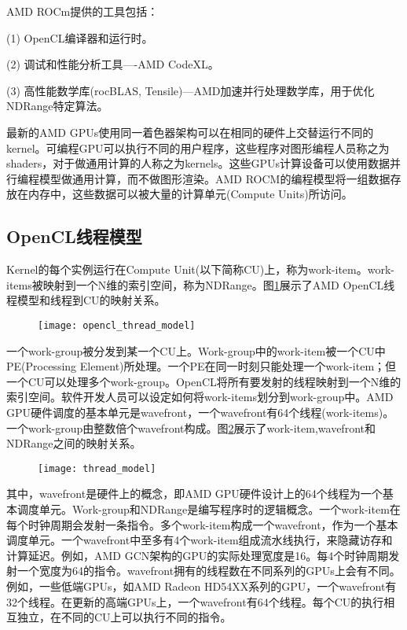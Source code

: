 AMD ROCm提供的工具包括：

(1) OpenCL编译器和运行时。

(2) 调试和性能分析工具----AMD CodeXL。

(3) 高性能数学库(rocBLAS, Tensile)---AMD加速并行处理数学库，用于优化NDRange特定算法。

最新的AMD GPUs使用同一着色器架构可以在相同的硬件上交替运行不同的kernel。可编程GPU可以执行不同的用户程序，这些程序对图形编程人员称之为shaders，对于做通用计算的人称之为kernels。这些GPUs计算设备可以使用数据并行编程模型做通用计算，而不做图形渲染。AMD ROCM的编程模型将一组数据存放在内存中，这些数据可以被大量的计算单元(Compute Units)所访问。

\subsection{OpenCL线程模型}
Kernel的每个实例运行在Compute Unit(以下简称CU)上，称为work-item。work-items被映射到一个N维的索引空间，称为NDRange。图\ref{fig:opencl_thread_model}展示了AMD OpenCL线程模型和线程到CU的映射关系。
\begin{figure}[htbp]
	\centering
	\texttt{[image: opencl\_thread\_model]}
	\label{fig:opencl_thread_model}
\end{figure}

一个work-group被分发到某一个CU上。Work-group中的work-item被一个CU中PE(Processing Element)所处理。一个PE在同一时刻只能处理一个work-item；但一个CU可以处理多个work-group。OpenCL将所有要发射的线程映射到一个N维的索引空间。软件开发人员可以设定如何将work-items划分到work-group中。AMD GPU硬件调度的基本单元是wavefront，一个wavefront有64个线程(work-items)。一个work-group由整数倍个wavefront构成。图\ref{fig:thread_model}展示了work-item,wavefront和NDRange之间的映射关系。
\begin{figure}[htbp]
	\centering
	\texttt{[image: thread\_model]}
	\label{fig:thread_model}
\end{figure}

其中，wavefront是硬件上的概念，即AMD GPU硬件设计上的64个线程为一个基本调度单元。Work-group和NDRange是编写程序时的逻辑概念。一个work-item在每个时钟周期会发射一条指令。多个work-item构成一个wavefront，作为一个基本调度单元。一个wavefront中至多有4个work-item组成流水线执行，来隐藏访存和计算延迟。例如，AMD GCN架构的GPU的实际处理宽度是16。每4个时钟周期发射一个宽度为64的指令。wavefront拥有的线程数在不同系列的GPUs上会有不同。例如，一些低端GPUs，如AMD Radeon HD54XX系列的GPU，一个wavefront有32个线程。在更新的高端GPUs上，一个wavefront有64个线程。每个CU的执行相互独立，在不同的CU上可以执行不同的指令。

